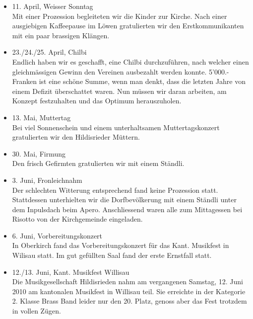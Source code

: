 \begin{history}
\begin{itemize}
            \item 11. April, Weisser Sonntag\\
                  Mit einer Prozession begleiteten wir die Kinder zur Kirche. Nach
                  einer ausgiebigen Kaffeepause im Löwen gratulierten wir den
                  Erstkommunikanten mit ein paar brassigen Klängen.

            \item 23./24./25. April, Chilbi\\
                  Endlich haben wir es geschafft, eine Chilbi durchzuführen, nach
                  welcher einen gleichmässigen Gewinn den Vereinen ausbezahlt werden
                  konnte. 5'000.- Franken ist eine schöne Summe, wenn man denkt,
                  dass die letzten Jahre von einem Defizit überschattet waren. Nun
                  müssen wir daran arbeiten, am Konzept festzuhalten und das Optimum
                  herauszuholen.

            \item 13. Mai, Muttertag\\
                  Bei viel Sonnenschein und einem unterhaltsamen Muttertagskonzert
                  gratulierten wir den Hildisrieder Müttern.

            \item 30. Mai, Firmung\\
                  Den frisch Gefirmten gratulierten wir mit einem Ständli.

            \item 3. Juni, Fronleichnahm\\
                  Der schlechten Witterung entsprechend fand keine Prozession statt.
                  Stattdessen unterhielten wir die Dorfbevölkerung mit einem Ständli
                  unter dem Inpulsdach beim Apero. Anschliessend waren alle zum
                  Mittagessen bei Risotto von der Kirchgemeinde eingeladen.

            \item 6. Juni, Vorbereitungskonzert\\
                  In Oberkirch fand das Vorbereitungskonzert für das Kant. Musikfest
                  in Wilisau statt. Im gut gefüllten Saal fand der erste Ernstfall
                  statt.

            \item 12./13. Juni, Kant. Musikfest Willisau\\
                  Die Musikgesellschaft Hildisrieden nahm am vergangenen Samstag, 12. Juni
                  2010 am kantonalen Musikfest in Willisau teil. Sie erreichte  in der
                  Kategorie 2. Klasse Brass Band leider nur den 20. Platz, genoss aber das
                  Fest trotzdem in vollen Zügen.


\end{itemize}
\end{history}
